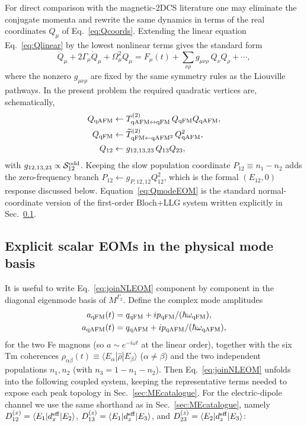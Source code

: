 \documentclass[reprint,amsmath,amssymb,aps,prb,longbibliography]{revtex4-2}
\begin{document}
For direct comparison with the magnetic-2DCS literature one may
eliminate the conjugate momenta and rewrite the same dynamics in terms
of the real coordinates $Q_\mu$ of Eq.~\eqref{eq:Qcoords}. Extending the
linear equation Eq.~\eqref{eq:Qlinear} by the lowest nonlinear terms
gives the standard form
\begin{equation}
\ddot Q_\mu + 2\Gamma_\mu \dot Q_\mu + \Omega_\mu^2 Q_\mu
= F_\mu(t) + \sum_{\nu\rho} g_{\mu\nu\rho}\,Q_\nu Q_\rho + \cdots,
\label{eq:QmodeEOM}
\end{equation}
where the nonzero $g_{\mu\nu\rho}$ are fixed by the same symmetry rules
as the Liouville pathways. In the present problem the required quadratic
vertices are, schematically,
\begin{equation}
\begin{aligned}
Q_{\rm qAFM} &\leftarrow T^{(2)}_{\rm qAFM\leftrightarrow qFM}\,Q_{\rm qFM}Q_{\rm qAFM},\\
Q_{\rm qFM} &\leftarrow \widetilde T^{(2)}_{\rm qFM\leftarrow qAFM^2}\,Q_{\rm qAFM}^2,\\
Q_{12} &\leftarrow g_{12,13,23}\,Q_{13}Q_{23},
\end{aligned}
\label{eq:QmodeVertices}
\end{equation}
with $g_{12,13,23}\propto \mathcal S_{12}^{\rm odd}$. Keeping the slow
population coordinate $P_{12}\equiv n_1-n_2$ adds the zero-frequency
branch $P_{12}\leftarrow g_{P,12,12}Q_{12}^2$, which is the formal
$(E_{12},0)$ response discussed below. Equation~\eqref{eq:QmodeEOM} is
the standard normal-coordinate version of the first-order Bloch+LLG
system written explicitly in Sec.~\ref{sec:EOMscalar}.

\subsection{Explicit scalar EOMs in the physical mode basis}
\label{sec:EOMscalar}

It is useful to write Eq.~\eqref{eq:joinNLEOM} component by component
in the diagonal eigenmode basis of $M^{\Gamma_2}$. Define the complex
mode amplitudes
\begin{align}
a_{\rm qFM}(t) &= q_{\rm qFM}+i p_{\rm qFM}/(\hbar\omega_{\rm qFM}),\\
a_{\rm qAFM}(t)&= q_{\rm qAFM}+i p_{\rm qAFM}/(\hbar\omega_{\rm qAFM}),
\end{align}
for the two Fe magnons (so $a\sim e^{-i\omega t}$ at the linear order),
together with the six Tm coherences
$\rho_{\alpha\beta}(t)\equiv\langle E_\alpha|\hat\rho|E_\beta\rangle$
($\alpha\neq\beta$) and the two independent populations
$n_1,n_2$ (with $n_3=1-n_1-n_2$). Then
Eq.~\eqref{eq:joinNLEOM} unfolds into the following coupled system,
keeping the representative terms needed to expose each peak topology in
Sec.~\ref{sec:MEcatalogue}. For the electric-dipole channel we use the
same shorthand as in Sec.~\ref{sec:MEcatalogue}, namely
$D_{12}^{(x)}=\langle E_1|d_x^{\rm eff}|E_2\rangle$,
$D_{13}^{(z)}=\langle E_1|d_z^{\rm eff}|E_3\rangle$, and
$D_{23}^{(z)}=\langle E_2|d_z^{\rm eff}|E_3\rangle$:
\end{document}

